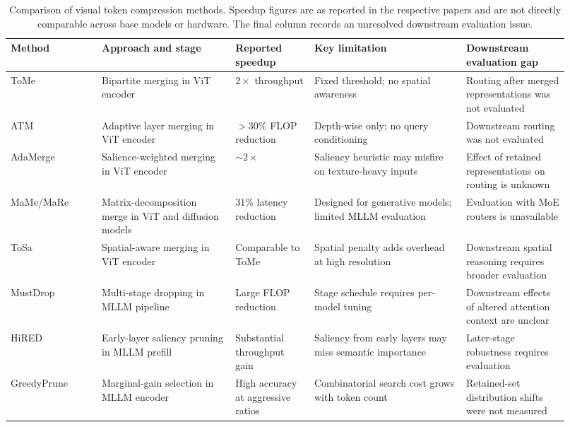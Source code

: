 \documentclass[10pt]{article}
\begin{document}
\begin{table}[!htbp]
\centering
\caption{Comparison of visual token compression methods. Speedup figures are as
reported in the respective papers and are not directly comparable across base models
or hardware.  The final column records an unresolved downstream evaluation issue.}
\label{tab:compression-methods}
\small
\renewcommand{\arraystretch}{1.15}
\setlength{\tabcolsep}{4pt}
\begin{tabular}{p{0.15\linewidth} p{0.22\linewidth} p{0.13\linewidth} p{0.25\linewidth} p{0.17\linewidth}}
\toprule
\textbf{Method} & \textbf{Approach and stage} & \textbf{Reported speedup} & \textbf{Key limitation} & \textbf{Downstream evaluation gap} \\
\midrule
ToMe \citep{bolya2023tokenmergingvitfaster} & Bipartite merging in ViT encoder & $2\times$ throughput & Fixed threshold; no spatial awareness & Routing after merged representations was not evaluated \\
ATM \citep{Lee_2025} & Adaptive layer merging in ViT encoder & ${>}30\%$ FLOP reduction & Depth-wise only; no query conditioning & Downstream routing was not evaluated \\
AdaMerge \citep{lee2026adamergesalienceawareadaptivetoken} & Salience-weighted merging in ViT encoder & ${\sim}2\times$ & Saliency heuristic may misfire on texture-heavy inputs & Effect of retained representations on routing is unknown \\
MaMe/MaRe \citep{huo2026mamemarematrixbased} & Matrix-decomposition merge in ViT and diffusion models & $31\%$ latency reduction & Designed for generative models; limited MLLM evaluation & Evaluation with MoE routers is unavailable \\
ToSa \citep{huang2025tosatokenmergingspatial} & Spatial-aware merging in ViT encoder & Comparable to ToMe & Spatial penalty adds overhead at high resolution & Downstream spatial reasoning requires broader evaluation \\
MustDrop \citep{liu2024multistagevisiontokendropping} & Multi-stage dropping in MLLM pipeline & Large FLOP reduction & Stage schedule requires per-model tuning & Downstream effects of altered attention context are unclear \\
HiRED \citep{arif2024hiredattentionguidedtokendropping} & Early-layer saliency pruning in MLLM prefill & Substantial throughput gain & Saliency from early layers may miss semantic importance & Later-stage robustness requires evaluation \\
GreedyPrune \citep{pei2025greedypruneretentingcriticalvisual} & Marginal-gain selection in MLLM encoder & High accuracy at aggressive ratios & Combinatorial search cost grows with token count & Retained-set distribution shifts were not measured \\

\end{tabular}
\end{table}
\end{document}
